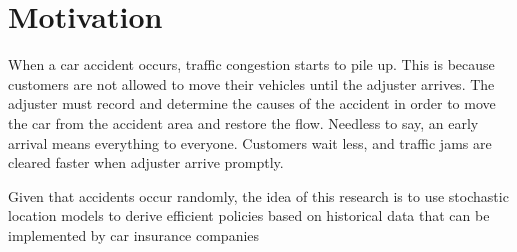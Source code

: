 \section{Motivation}
When a car accident occurs,
traffic congestion starts to pile up.
This is because
customers are not allowed
to move their vehicles until
the adjuster arrives.
The adjuster must record and determine
the causes of the accident
in order to
move the car from the accident area
and restore the flow.
Needless to say,
an early arrival
means everything to everyone.
Customers wait less,
and traffic jams
are cleared faster
when adjuster arrive promptly.

Given that accidents occur randomly,
the idea of this research
is to use stochastic location models
to derive efficient policies
based on historical data
that can be implemented
by car insurance companies


